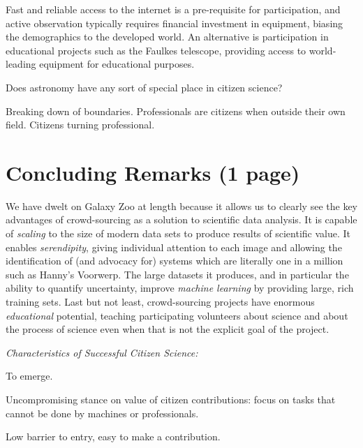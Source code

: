 \documentclass{ar2e}
\begin{document}
Fast and reliable access  to the internet is
a pre-requisite for participation, and active  observation typically requires
financial investment in equipment,  biasing the demographics to the developed
world.  An alternative is  participation in educational projects such as the
Faulkes telescope,  providing access to world-leading equipment for
educational purposes.

Does astronomy have any sort of special place in citizen science?

Breaking down of boundaries. Professionals are citizens when outside their own
field. Citizens turning professional.


\section{Concluding Remarks (1 page)}
\label{sec:conclusions}


We have dwelt on Galaxy Zoo at length because it allows us to clearly see the
key advantages of crowd-sourcing as a solution to scientific data analysis. It
is capable of \emph{scaling} to the size of modern data sets to produce results
of scientific value. It enables \emph{serendipity}, giving individual attention
to each image and allowing the identification of (and advocacy for) systems
which are literally one in a million such as Hanny's Voorwerp. The large
datasets it produces, and in particular the ability to quantify uncertainty,
improve \emph{machine learning} by providing large, rich training sets. Last but
not least, crowd-sourcing projects have enormous \emph{educational} potential,
teaching participating volunteers about science and about the process of science
even when that is not the explicit goal of the project. 


{\it Characteristics of Successful Citizen Science:}


To emerge.

Uncompromising stance on value of citizen contributions: focus on tasks that
cannot be done by machines or professionals.

Low barrier to entry, easy to make a contribution.
\end{document}
